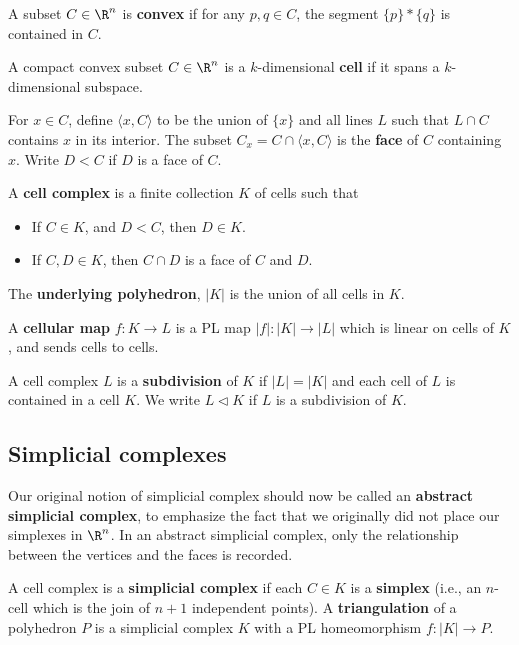 \documentclass[12pt]{pset}
\newcommand{\join}{\ast}
\newcommand{\subdivided}{\triangleleft}
\begin{document}
\begin{definition*}
 A subset $C \in \R^n$ is \textbf{convex} if for any $p,q \in C$, the
 segment $\{p\} \join \{q\}$ is contained in $C$.
\end{definition*}

\begin{definition*}
  A compact convex subset $C \in \R^n$ is a $k$-dimensional
  \textbf{cell} if it spans a $k$-dimensional subspace.

  For $x \in C$, define $\langle x, C \rangle$ to be the union of
  $\{x\}$ and all lines $L$ such that $L \cap C$ contains $x$ in its
  interior.  The subset $C_x = C \cap \langle x, C \rangle$ is the
  \textbf{face} of $C$ containing $x$. Write $D < C$ if $D$ is a face
  of $C$.
\end{definition*}

\begin{definition*}
  A \textbf{cell complex} is a finite collection $K$ of cells such that
  \begin{itemize}
  \item If $C \in K$, and $D < C$, then $D \in K$.
  \item If $C, D \in K$, then $C \cap D$ is a face of $C$ and $D$.
  \end{itemize}
  The \textbf{underlying polyhedron}, $|K|$ is the union of all cells
  in $K$.

  A \textbf{cellular map} $f : K \to L$ is a PL map $|f| : |K| \to
  |L|$ which is linear on cells of $K$, and sends cells to cells.
\end{definition*}

\begin{definition*}
  A cell complex $L$ is a \textbf{subdivision} of $K$ if $|L| = |K|$
  and each cell of $L$ is contained in a cell $K$.  We write $L
  \subdivided K$ if $L$ is a subdivision of $K$.
\end{definition*}

\pagebreak
\subsection*{Simplicial complexes}

Our original notion of simplicial complex should now be called an
\textbf{abstract simplicial complex}, to emphasize the fact that we
originally did not place our simplexes in $\R^n$.  In an abstract
simplicial complex, only the relationship between the vertices and the
faces is recorded.

\begin{definition*}
  A cell complex is a \textbf{simplicial complex} if each $C \in K$ is
  a \textbf{simplex} (i.e., an $n$-cell which is the join of $n+1$
  independent points).  A \textbf{triangulation} of a polyhedron $P$
  is a simplicial complex $K$ with a PL homeomorphism $f : |K| \to P$.
\end{definition*}
\end{document}
